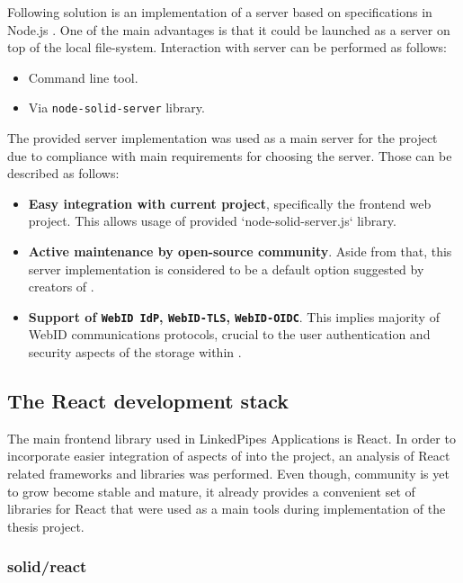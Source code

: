 Following solution is an implementation of a server based on \solid{} specifications in Node.js \cite{node_solid_server}.
One of the main advantages is that it could be launched as a \solid{} server on top of the local file-system. Interaction with server can be performed as follows:
\begin{itemize}
	\item Command line tool.
    \item Via \texttt{node-solid-server} library.
\end{itemize}

The provided server implementation was used as a main \solid{} server for the project due to compliance with main requirements for choosing the server. Those can be described as follows:
\begin{itemize}
	\item \textbf{Easy integration with current \lpa{} project}, specifically the frontend web project. This allows usage of provided `node-solid-server.js` library.
    \item \textbf{Active maintenance by open-source community}. Aside from that, this server implementation is considered to be a default option suggested by creators of \solid{}.
    \item \textbf{Support of \texttt{WebID IdP}, \texttt{WebID-TLS}, \texttt{WebID-OIDC}}. This implies majority of WebID communications protocols,
    crucial to the user authentication and security aspects of the storage within \lpa{}.
\end{itemize}


\subsection{The \solid{} React development stack}

The main frontend library used in LinkedPipes Applications is React. In order to incorporate easier integration of aspects of \solid{} into the project, an analysis of React related \solid{} frameworks and libraries was performed. Even though, \solid{} community is yet to grow become stable and mature, it already provides a convenient set of libraries for React that were used as a main tools during implementation of the thesis project. 

\subsubsection{solid/react}

